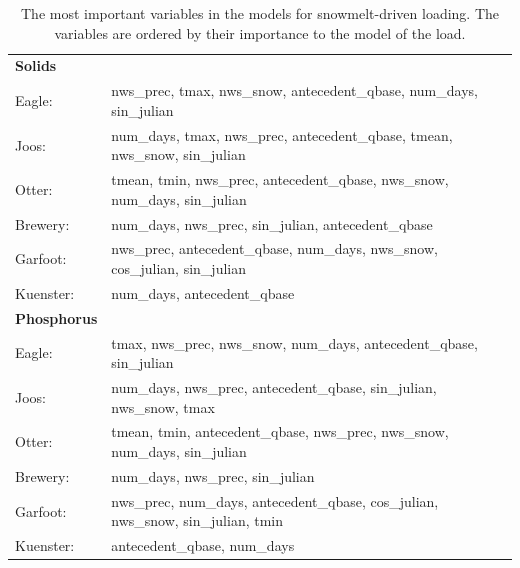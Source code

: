 \documentclass[12pt]{article}
\begin{document}
\begin{table}[h!]\small
    \begin{center}
    \begin{tabular}{ll}
        \textbf{Solids} & \\
        \hspace{5mm} Eagle: & nws\_prec, tmax, nws\_snow, antecedent\_qbase, num\_days, sin\_julian\\
        \hspace{5mm} Joos: & num\_days, tmax, nws\_prec, antecedent\_qbase, tmean, nws\_snow, sin\_julian\\
        \hspace{5mm} Otter: & tmean, tmin, nws\_prec, antecedent\_qbase, nws\_snow, num\_days, sin\_julian\\
        \hspace{5mm} Brewery: & num\_days, nws\_prec, sin\_julian, antecedent\_qbase\\
        \hspace{5mm} Garfoot: & nws\_prec, antecedent\_qbase, num\_days, nws\_snow, cos\_julian, sin\_julian\\
        \hspace{5mm} Kuenster: & num\_days, antecedent\_qbase
    \vspace{2mm}\\
        \textbf{Phosphorus} & \\
        \hspace{5mm} Eagle: & tmax, nws\_prec, nws\_snow, num\_days, antecedent\_qbase, sin\_julian\\
        \hspace{5mm} Joos: & num\_days, nws\_prec, antecedent\_qbase, sin\_julian, nws\_snow, tmax\\
        \hspace{5mm} Otter: & tmean, tmin, antecedent\_qbase, nws\_prec, nws\_snow, num\_days, sin\_julian\\
        \hspace{5mm} Brewery: & num\_days, nws\_prec, sin\_julian\\
        \hspace{5mm} Garfoot: & nws\_prec, num\_days, antecedent\_qbase, cos\_julian, nws\_snow, sin\_julian, tmin\\
        \hspace{5mm} Kuenster: & antecedent\_qbase, num\_days\\
    \end{tabular}
    \caption{The most important variables in the models for snowmelt-driven loading. The variables are ordered by their importance to the model of the load. \label{snow_predictor_list}}
    \end{center}
\end{table}
\end{document}

